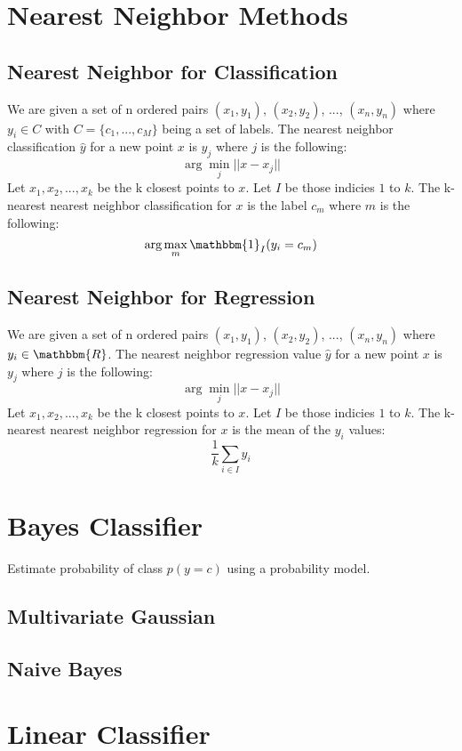 \documentclass[twoside,11pt]{article}
\theoremstyle{definition}
\begin{document}
\section{Nearest Neighbor Methods}

\subsection{Nearest Neighbor for Classification}

We are given a set of n ordered pairs $(x_1,y_1)$, $(x_2,y_2)$, ..., $(x_n,y_n)$ where $y_i \in C$ with $C=\{ c_1, ..., c_M \}$ being a set of labels. The nearest neighbor classification $\hat{y}$ for a new point $x$ is $y_j$ where $j$ is the following:
\[
\arg \min_j||x-x_j||
\]
Let $x_1,x_2,...,x_k$ be the k closest points to $x$. Let $I$ be those indicies $1$ to $k$. The k-nearest nearest neighbor classification for $x$ is the label $c_m$ where $m$ is the following:
\[
\arg \max_m \mathbbm{1}_{I}{(y_i=c_m)}
\]

\subsection{Nearest Neighbor for Regression}

We are given a set of n ordered pairs $(x_1,y_1)$, $(x_2,y_2)$, ..., $(x_n,y_n)$ where $y_i \in \mathbbm{R}$. The nearest neighbor regression value $\hat{y}$ for a new point $x$ is $y_j$ where $j$ is the following:
\[
\arg \min_j||x-x_j||
\]
Let $x_1,x_2,...,x_k$ be the k closest points to $x$. Let $I$ be those indicies $1$ to $k$. The k-nearest nearest neighbor regression for $x$ is the mean of the $y_i$ values:
\[
\frac{1}{k} \sum_{i \in I} y_i
\]

\section{Bayes Classifier}

Estimate probability of class $p(y=c)$ using a probability model. 

\subsection{Multivariate Gaussian}

\subsection{Naive Bayes}
\newpage

\section{Linear Classifier}
\end{document}
